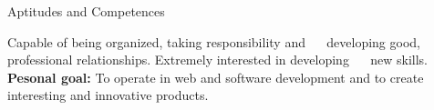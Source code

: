 \begin{rubric}{Aptitudes and Competences}{

  \entry* Capable of being organized, taking responsibility and
   developing good, professional relationships. Extremely interested in developing
   new skills.
  \entry* \textbf{Pesonal goal:} To operate in web and software development
  and to create interesting and innovative products.
}
\end{rubric} 
